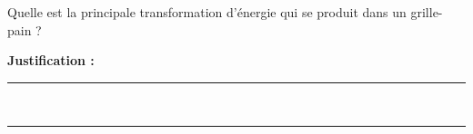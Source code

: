 Quelle est la principale transformation d'énergie qui se produit dans un grille-pain ?

\choices

\noindent\textbf{Justification :} \hrulefill \\[2.5ex]
\rule{\linewidth}{0.4pt} \\[2.5ex]
\rule{\linewidth}{0.4pt}
\vfill
